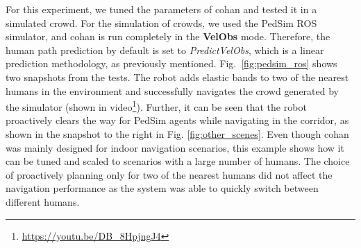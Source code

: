 For this experiment, we tuned the parameters of \acrshort{cohan} and tested it in a simulated crowd. For the simulation of crowds, we used the PedSim ROS simulator, and \acrshort{cohan} is run completely in the \textbf{VelObs} mode. Therefore, the human path prediction by default is set to \textit{PredictVelObs}, which is a linear prediction methodology, as previously mentioned. Fig.~\ref{fig:pedsim_ros} shows two snapshots from the tests. The robot adds elastic bands to two of the nearest humans in the environment and successfully navigates the crowd generated by the simulator (shown in video\footnote{\url{https://youtu.be/DB_8HpjngJ4}\label{cohan_video}}). Further, it can be seen that the robot proactively clears the way for PedSim agents while navigating in the corridor, as shown in the snapshot to the right in Fig. \ref{fig:other_scenes}. Even though \acrshort{cohan} was mainly designed for indoor navigation scenarios, this example shows how it can be tuned and scaled to scenarios with a large number of humans. The choice of proactively planning only for two of the nearest humans did not affect the navigation performance as the system was able to quickly switch between different humans.  

